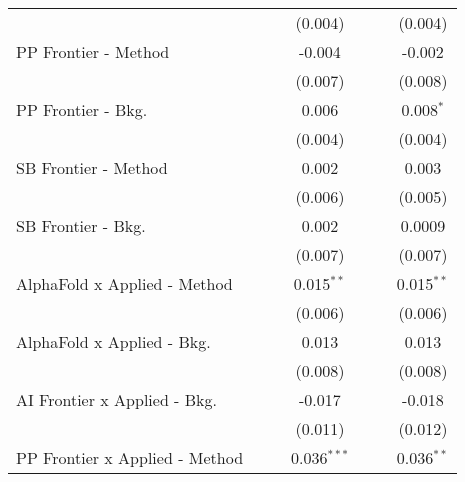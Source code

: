 \begin{tabular}{lcccccc}
                                  &               &                & (0.004)        &                &                & (0.004)\\   
   PP Frontier - Method           &               &                & -0.004         &                &                & -0.002\\   
                                  &               &                & (0.007)        &                &                & (0.008)\\   
   PP Frontier - Bkg.             &               &                & 0.006          &                &                & 0.008$^{*}$\\   
                                  &               &                & (0.004)        &                &                & (0.004)\\   
   SB Frontier - Method           &               &                & 0.002          &                &                & 0.003\\   
                                  &               &                & (0.006)        &                &                & (0.005)\\   
   SB Frontier - Bkg.             &               &                & 0.002          &                &                & 0.0009\\   
                                  &               &                & (0.007)        &                &                & (0.007)\\   
   AlphaFold x Applied - Method   &               &                & 0.015$^{**}$   &                &                & 0.015$^{**}$\\   
                                  &               &                & (0.006)        &                &                & (0.006)\\   
   AlphaFold x Applied - Bkg.     &               &                & 0.013          &                &                & 0.013\\   
                                  &               &                & (0.008)        &                &                & (0.008)\\   
   AI Frontier x Applied - Bkg.   &               &                & -0.017         &                &                & -0.018\\   
                                  &               &                & (0.011)        &                &                & (0.012)\\   
   PP Frontier x Applied - Method &               &                & 0.036$^{***}$  &                &                & 0.036$^{**}$\\   

\end{tabular}
